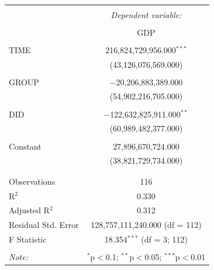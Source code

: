 \documentclass[12pt,english]{article}
\begin{document}
\begin{table}[!htbp] \centering 
  \caption{} 
  \label{} 
\begin{tabular}{@{\extracolsep{5pt}}lc} 
\\[-1.8ex]\hline 
\hline \\[-1.8ex] 
 & \multicolumn{1}{c}{\textit{Dependent variable:}} \\ 
\cline{2-2} 
\\[-1.8ex] & GDP \\ 
\hline \\[-1.8ex] 
 TIME & 216,824,729,956.000$^{***}$ \\ 
  & (43,126,076,569.000) \\ 
  & \\ 
 GROUP & $-$20,206,883,389.000 \\ 
  & (54,902,216,705.000) \\ 
  & \\ 
 DID & $-$122,632,825,911.000$^{**}$ \\ 
  & (60,989,482,377.000) \\ 
  & \\ 
 Constant & 27,896,670,724.000 \\ 
  & (38,821,729,734.000) \\ 
  & \\ 
\hline \\[-1.8ex] 
Observations & 116 \\ 
R$^{2}$ & 0.330 \\ 
Adjusted R$^{2}$ & 0.312 \\ 
Residual Std. Error & 128,757,111,240.000 (df = 112) \\ 
F Statistic & 18.354$^{***}$ (df = 3; 112) \\ 
\hline 
\hline \\[-1.8ex] 
\textit{Note:}  & \multicolumn{1}{r}{$^{*}$p$<$0.1; $^{**}$p$<$0.05; $^{***}$p$<$0.01} \\ 
\end{tabular} 
\end{table} 
\end{document}
